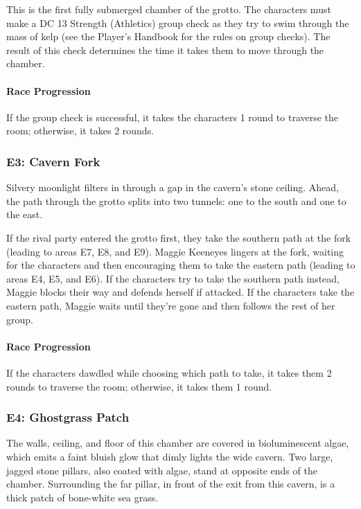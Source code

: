 \documentclass[10pt,a4paper,twoside,bg=print,twocolumn,openany,nodeprecatedcode]{dndbook}
\begin{document}
This is the first fully submerged chamber of the grotto. The characters must make a DC 13 Strength (Athletics) group check as they try to swim through the mass of kelp (see the Player's Handbook for the rules on group checks). The result of this check determines the time it takes them to move through the chamber.

\paragraph{Race Progression}
If the group check is successful, it takes the characters 1 round to traverse the room; otherwise, it takes 2 rounds.

\subsubsection{E3: Cavern Fork}
\begin{DndReadAloud}{}
Silvery moonlight filters in through a gap in the cavern's stone ceiling. Ahead, the path through the grotto splits into two tunnels: one to the south and one to the east.

\end{DndReadAloud}

If the rival party entered the grotto first, they take the southern path at the fork (leading to areas E7, E8, and E9). Maggie Keeneyes lingers at the fork, waiting for the characters and then encouraging them to take the eastern path (leading to areas E4, E5, and E6). If the characters try to take the southern path instead, Maggie blocks their way and defends herself if attacked. If the characters take the eastern path, Maggie waits until they're gone and then follows the rest of her group.

\paragraph{Race Progression}
If the characters dawdled while choosing which path to take, it takes them 2 rounds to traverse the room; otherwise, it takes them 1 round.

\subsubsection{E4: Ghostgrass Patch}
\begin{DndReadAloud}{}
The walls, ceiling, and floor of this chamber are covered in bioluminescent algae, which emits a faint bluish glow that dimly lights the wide cavern. Two large, jagged stone pillars, also coated with algae, stand at opposite ends of the chamber. Surrounding the far pillar, in front of the exit from this cavern, is a thick patch of bone-white sea grass.

\end{DndReadAloud}
\end{document}
